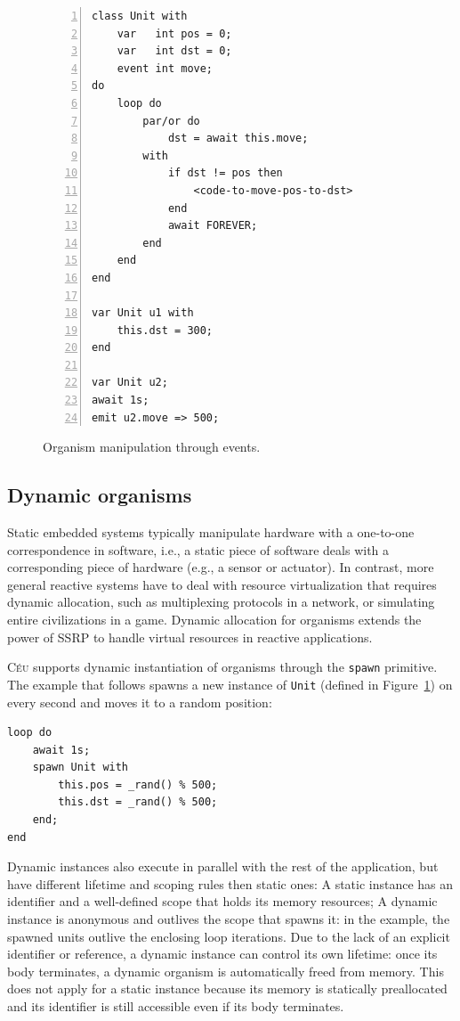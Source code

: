 \documentclass{sigplanconf}
\newcommand{\CEU}{\textsc{C\'{e}u}\xspace}
\newcommand{\code}[1] {{\small{\texttt{#1}}}}
\newcommand{\1}{\;}
\newcommand{\2}{\;\;}
\newcommand{\3}{\;\;\;}
\newcommand{\5}{\;\;\;\;\;}
\begin{document}
\begin{figure}%
\begin{lstlisting}[numbers=left,xleftmargin=3em]
class Unit with
    var   int pos = 0;
    var   int dst = 0;
    event int move;
do
    loop do
        par/or do
            dst = await this.move;
        with
            if dst != pos then
                <code-to-move-pos-to-dst>
            end
            await FOREVER;
        end
    end
end

var Unit u1 with
    this.dst = 300;
end

var Unit u2;
await 1s;
emit u2.move => 500;
\end{lstlisting}
\caption{ Organism manipulation through events.
\label{lst.unit}
}
\end{figure}

\subsection{Dynamic organisms}
\label{sec.orgs.dyn}

Static embedded systems typically manipulate hardware with a one-to-one 
correspondence in software, i.e., a static piece of software deals with a 
corresponding piece of hardware (e.g., a sensor or actuator).
%
In contrast, more general reactive systems have to deal with resource 
virtualization that requires dynamic allocation, such as multiplexing protocols 
in a network, or simulating entire civilizations in a game.
%
Dynamic allocation for organisms extends the power of SSRP to handle virtual 
resources in reactive applications.

\CEU supports dynamic instantiation of organisms through the \code{spawn} 
primitive.
The example that follows spawns a new instance of \code{Unit} (defined in 
Figure~\ref{lst.unit}) on every second and moves it to a random position:

\begin{lstlisting}
loop do
    await 1s;
    spawn Unit with
        this.pos = _rand() % 500;
        this.dst = _rand() % 500;
    end;
end
\end{lstlisting}


Dynamic instances also execute in parallel with the rest of the application, 
but have different lifetime and scoping rules then static ones:
%
A static instance has an identifier and a well-defined scope that holds its 
memory resources;
A dynamic instance is anonymous and outlives the scope that spawns it:
in the example, the spawned units outlive the enclosing loop iterations.
%
Due to the lack of an explicit identifier or reference, a dynamic instance can 
control its own lifetime:
once its body terminates, a dynamic organism is automatically freed from 
memory.
%
This does not apply for a static instance because its memory is statically 
preallocated and its identifier is still accessible even if its body 
terminates.
\end{document}

